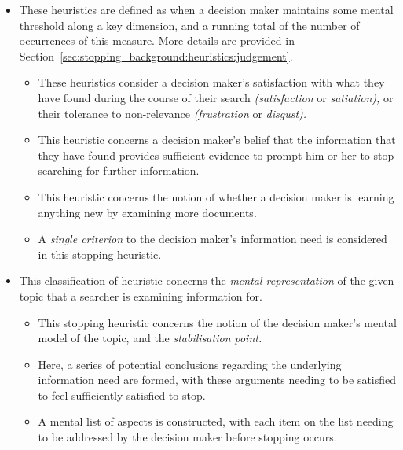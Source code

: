 \begin{itemize}
    \item{ These heuristics are defined as when a decision maker maintains some mental threshold along a key dimension, and a running total of the number of occurrences of this measure. More details are provided in Section~\ref{sec:stopping_background:heuristics:judgement}.}
    \begin{itemize}
        \item{ These heuristics consider a decision maker's satisfaction with what they have found during the course of their search \emph{(satisfaction} or \emph{satiation),} or their tolerance to non-relevance \emph{(frustration} or \emph{disgust).}}
        \item{ This heuristic concerns a decision maker's belief that the information that they have found provides sufficient evidence to prompt him or her to stop searching for further information.}
        \item{ This heuristic concerns the notion of whether a decision maker is learning anything new by examining more documents.}
        \item{ A \emph{single criterion} to the decision maker's information need is considered in this stopping heuristic.}
    \end{itemize}
    
    \item{ This classification of heuristic concerns the \emph{mental representation} of the given topic that a searcher is examining information for.}
    \begin{itemize}
        \item{ This stopping heuristic concerns the notion of the decision maker's mental model of the topic, and the \emph{stabilisation point.}}
        \item{ Here, a series of potential conclusions regarding the underlying information need are formed, with these arguments needing to be satisfied to feel sufficiently satisfied to stop.}
        \item{ A mental list of aspects is constructed, with each item on the list needing to be addressed by the decision maker before stopping occurs.}
    \end{itemize}
\end{itemize}

